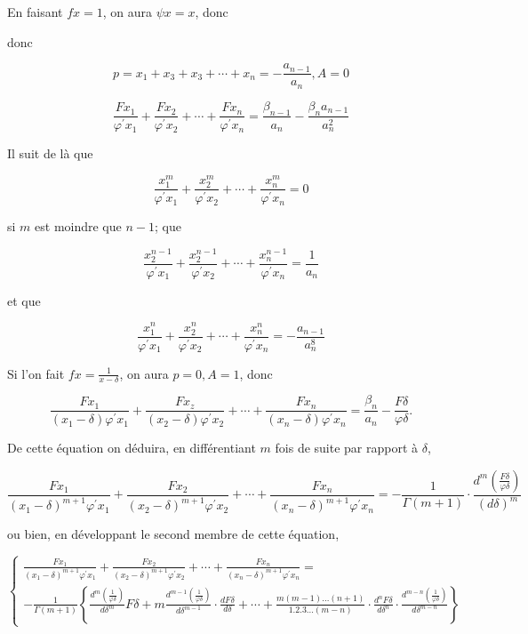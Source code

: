 \documentclass{article}
\begin{document}
En faisant \(f x=1\), on aura \(\psi x=x\), donc

donc

\[
p=x_{1}+x_{3}+x_{3}+\cdots+x_{n}=-\frac{a_{n-1}}{a_{n}}, A=0
\]

\[
\frac{F x_{1}}{\varphi^{\prime} x_{1}}+\frac{F x_{2}}{\varphi^{\prime} x_{2}}+\cdots+\frac{F x_{n}}{\varphi^{\prime} x_{n}}=\frac{\beta_{n-1}}{a_{n}}-\frac{\beta_{n} a_{n-1}}{a_{n}^{2}}
\]

Il suit de là que

\[
\frac{x_{1}^{m}}{\varphi^{\prime} x_{1}}+\frac{x_{2}^{m}}{\varphi^{\prime} x_{2}}+\cdots+\frac{x_{n}^{m}}{\varphi^{\prime} x_{n}}=0
\]

si \(m\) est moindre que \(n-1\); que

\[
\frac{x_{2}^{n-1}}{\varphi^{\prime} x_{1}}+\frac{x_{2}^{n-1}}{\varphi^{\prime} x_{2}}+\cdots+\frac{x_{n}^{n-1}}{\varphi^{\prime} x_{n}}=\frac{1}{a_{n}}
\]

et que

\[
\frac{x_{1}^{n}}{\varphi^{\prime} x_{1}}+\frac{x_{2}^{n}}{\varphi^{\prime} x_{2}}+\cdots+\frac{x_{n}^{n}}{\varphi^{\prime} x_{n}}=-\frac{a_{n-1}}{a_{n}^{8}}
\]

Si l'on fait \(f x=\frac{1}{x-\delta}\), on aura \(p=0, A=1\), donc

\[
\frac{F x_{1}}{\left(x_{1}-\delta\right) \varphi^{\prime} x_{1}}+\frac{F x_{z}}{\left(x_{2}-\delta\right) \varphi^{\prime} x_{2}}+\cdots+\frac{F x_{n}}{\left(x_{n}-\delta\right) \varphi^{\prime} x_{n}}=\frac{\beta_{n}}{a_{n}}-\frac{F \delta}{\varphi \delta} .
\]

De cette équation on déduira, en différentiant \(m\) fois de suite par rapport à \(\delta\),

\[
\frac{F x_{1}}{\left(x_{1}-\delta\right)^{m+1} \varphi^{\prime} x_{1}}+\frac{F x_{2}}{\left(x_{2}-\delta\right)^{m+1} \varphi^{\prime} x_{2}}+\cdots+\frac{F x_{n}}{\left(x_{n}-\delta\right)^{m+1} \varphi^{\prime} x_{n}}=-\frac{1}{\Gamma(m+1)} \cdot \frac{d^{m}\left(\frac{F \delta}{\varphi \delta}\right)}{(d \delta)^{m}}
\]

ou bien, en développant le second membre de cette équation,

\[
\left\{\begin{array}{c}
\frac{F x_{1}}{\left(x_{1}-\delta\right)^{m+1} \varphi^{\prime} x_{1}}+\frac{F x_{2}}{\left(x_{2}-\delta\right)^{m+1} \varphi^{\prime} x_{2}}+\cdots+\frac{F x_{n}}{\left(x_{n}-\delta\right)^{m+1} \varphi^{\prime} x_{n}}= \\
-\frac{1}{\Gamma(m+1)}\left\{\frac{d^{m}\left(\frac{1}{\varphi \delta}\right)}{d \delta^{m}} F \delta+m \frac{d^{m-1}\left(\frac{1}{\varphi \delta}\right)}{d \delta^{m-1}} \cdot \frac{d F \delta}{d \delta}+\cdots+\frac{m(m-1) \ldots(n+1)}{1.2 .3 \ldots(m-n)} \cdot \frac{d^{n} F \delta}{d \delta^{n}} \cdot \frac{d^{m-n}\left(\frac{1}{\varphi \delta}\right)}{d \delta^{m-n}}\right\}
\end{array}\right.
\]
\end{document}
